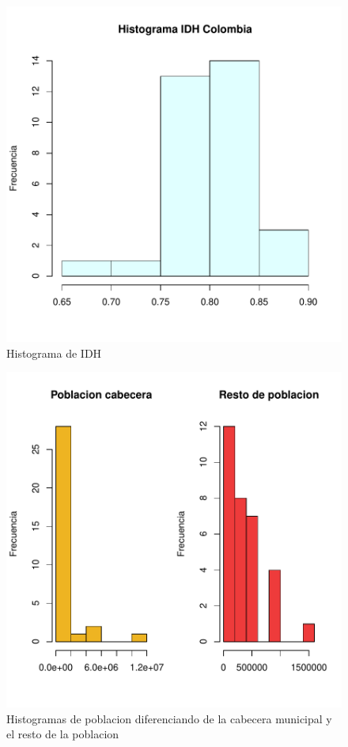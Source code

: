 \documentclass{article}
\begin{document}
\begin{figure}[h]
\centering
\begin{adjustbox}{width=5cm,height=5cm,clip,trim=1.5cm 0.5cm 0cm 1.5cm}
\includegraphics{Proyecto-003}
\end{adjustbox}
\caption{Histograma de IDH}
\label{histogramaIDH}
\end{figure}


\begin{figure}
\centering
\begin{adjustbox}{width=7cm,height=7cm,clip,trim=1.5cm 0.5cm 0cm 1.5cm}
\includegraphics{Proyecto-004}
\end{adjustbox}
\caption{Histogramas de poblacion diferenciando de la cabecera municipal y el resto de la poblacion}
\label{histogramaPobla}
\end{figure}
\end{document}
